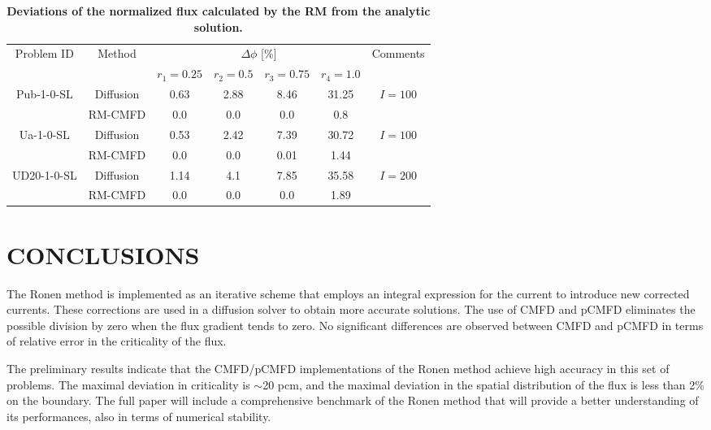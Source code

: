 \documentclass[letterpaper]{mc2021}
\begin{document}
\begin{table}[htb]
	\vspace{-5.5mm}
	\centering
	\small
	\caption{\bf Deviations of the normalized flux calculated by the RM from the analytic solution.}
	\label{table:res2} 
	\begin{tabular}{|c|c|c|c|c|c|c|} \hline 
	\multirow{2}{*}{Problem ID} & \multirow{2}{*}{Method} & \multicolumn{4}{c|}{$\Delta\phi$ [\%]} & \multirow{2}{*}{Comments} \\
	\cline{3-6}
	& & $r_1 = 0.25$ & $r_2 = 0.5$ & $r_3 = 0.75$ & $r_4 = 1.0$ & \\
	\hline
	\multirow{2}{*}{Pub-1-0-SL} & Diffusion  & 0.63 & 2.88 & 8.46 & 31.25 & \multirow{2}{*}{$I=100$} \\
	\cline{2-6}
	& RM-CMFD 	     & 0.0 & 0.0 & 0.0 & 0.8 & \\ \hline
	\multirow{2}{*}{Ua-1-0-SL}  & Diffusion  & 0.53 & 2.42 & 7.39 & 30.72 & \multirow{2}{*}{$I=100$}\\
	\cline{2-6} 
	& RM-CMFD       & 0.0 & 0.0 & 0.01 & 1.44 & \\ \hline 
	\multirow{2}{*}{UD20-1-0-SL} & Diffusion & 1.14 & 4.1 & 7.85 & 35.58 & \multirow{2}{*}{$I=200$} \\ 
	\cline{2-6} 		
	& RM-CMFD      & 0.0 & 0.0 & 0.0 & 1.89 & \\ \hline 		
\end{tabular}
\vspace{-5.0mm}
\end{table}

\vspace{-6.5mm}

\section{CONCLUSIONS}

The Ronen method is implemented as an iterative scheme that employs an integral expression for the current to introduce new corrected currents. These corrections are used in a diffusion solver to obtain more accurate solutions. The use of CMFD and pCMFD eliminates the possible division by zero when the flux gradient tends to zero. No significant differences are observed between CMFD and pCMFD in terms of relative error in the criticality of the flux. 

\vspace{-1.5mm}

The preliminary results indicate that the CMFD/pCMFD implementations of the Ronen method achieve high accuracy in this set of problems. The maximal deviation in criticality is $\sim$20 pcm, and the maximal deviation in the spatial distribution of the flux is less than 2\% on the boundary.  
%
The full paper will include a comprehensive benchmark of the Ronen method that will provide a better understanding of its performances, also in terms of numerical stability.
\end{document}
